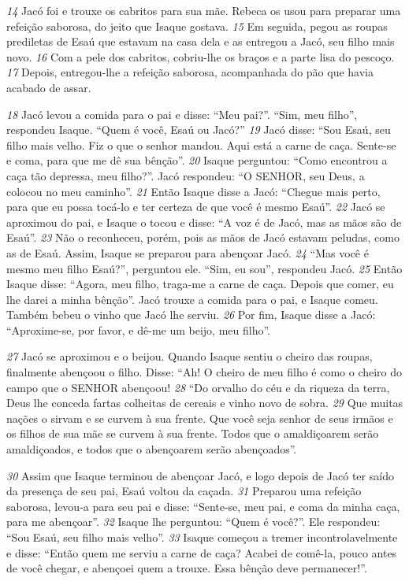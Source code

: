 \bigskip   
\textit{\tiny 14}
Jacó foi e trouxe os cabritos para sua mãe. Rebeca os usou para preparar uma
refeição saborosa, do jeito que Isaque gostava. 
\textit{\tiny 15}
Em seguida, pegou as roupas
prediletas de Esaú que estavam na casa dela e as entregou a Jacó, seu filho mais
novo. 
\textit{\tiny 16}
Com a pele dos cabritos, cobriu-lhe os braços e a parte lisa do pescoço.
\textit{\tiny 17}
Depois, entregou-lhe a refeição saborosa, acompanhada do pão que havia
acabado de assar.
   
\bigskip   
\textit{\tiny 18}
Jacó levou a comida para o pai e disse: “Meu pai?”.
“Sim, meu filho”, respondeu Isaque. “Quem é você, Esaú ou Jacó?”
\textit{\tiny 19}
Jacó disse: “Sou Esaú, seu filho mais velho. Fiz o que o senhor mandou. Aqui
está a carne de caça. Sente-se e coma, para que me dê sua bênção”.
\textit{\tiny 20}
Isaque perguntou: “Como encontrou a caça tão depressa, meu filho?”.
   Jacó respondeu: “O SENHOR, seu Deus, a colocou no meu caminho”.
\textit{\tiny 21}
Então Isaque disse a Jacó: “Chegue mais perto, para que eu possa tocá-lo e ter
certeza de que você é mesmo Esaú”. 
\textit{\tiny 22}
Jacó se aproximou do pai, e Isaque o tocou
e disse: “A voz é de Jacó, mas as mãos são de Esaú”. 
\textit{\tiny 23}
Não o reconheceu, porém,
pois as mãos de Jacó estavam peludas, como as de Esaú. Assim, Isaque se preparou
para abençoar Jacó. 
\textit{\tiny 24}
“Mas você é mesmo meu filho Esaú?”, perguntou ele.
   “Sim, eu sou”, respondeu Jacó.
\textit{\tiny 25}
Então Isaque disse: “Agora, meu filho, traga-me a carne de caça. Depois que
comer, eu lhe darei a minha bênção”. Jacó trouxe a comida para o pai, e Isaque
comeu. Também bebeu o vinho que Jacó lhe serviu. 
\textit{\tiny 26}
Por fim, Isaque disse a Jacó:
“Aproxime-se, por favor, e dê-me um beijo, meu filho”.
   
\bigskip   
\textit{\tiny 27}
Jacó se aproximou e o beijou. Quando Isaque sentiu o cheiro das roupas,
finalmente abençoou o filho. Disse: “Ah! O cheiro de meu filho é como o cheiro
do campo que o SENHOR abençoou!
\textit{\tiny 28}
“Do orvalho do céu
    e da riqueza da terra,
  Deus lhe conceda fartas colheitas de cereais
    e vinho novo de sobra.
\textit{\tiny 29}
Que muitas nações o sirvam
    e se curvem à sua frente.
  Que você seja senhor de seus irmãos
    e os filhos de sua mãe se curvem à sua frente.
  Todos que o amaldiçoarem serão amaldiçoados,
    e todos que o abençoarem serão abençoados”.

\bigskip
\textit{\tiny 30}
Assim que Isaque terminou de abençoar Jacó, e logo depois de Jacó ter saído
da presença de seu pai, Esaú voltou da caçada. 
\textit{\tiny 31}
Preparou uma refeição saborosa,
levou-a para seu pai e disse: “Sente-se, meu pai, e coma da minha caça, para me
abençoar”.
\textit{\tiny 32}
Isaque lhe perguntou: “Quem é você?”.
   Ele respondeu: “Sou Esaú, seu filho mais velho”. 
\textit{\tiny 33}
Isaque começou a tremer incontrolavelmente e disse: “Então quem me serviu
a carne de caça? Acabei de comê-la, pouco antes de você chegar, e abençoei quem
a trouxe. Essa bênção deve permanecer!”.
   
